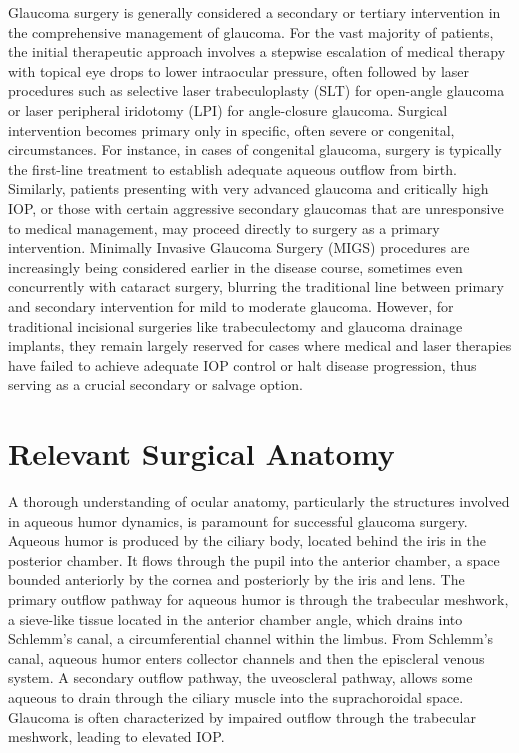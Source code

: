 Glaucoma surgery is generally considered a secondary or tertiary intervention in the comprehensive management of glaucoma. For the vast majority of patients, the initial therapeutic approach involves a stepwise escalation of medical therapy with topical eye drops to lower intraocular pressure, often followed by laser procedures such as selective laser trabeculoplasty (SLT) for open-angle glaucoma or laser peripheral iridotomy (LPI) for angle-closure glaucoma. Surgical intervention becomes primary only in specific, often severe or congenital, circumstances. For instance, in cases of congenital glaucoma, surgery is typically the first-line treatment to establish adequate aqueous outflow from birth. Similarly, patients presenting with very advanced glaucoma and critically high IOP, or those with certain aggressive secondary glaucomas that are unresponsive to medical management, may proceed directly to surgery as a primary intervention. Minimally Invasive Glaucoma Surgery (MIGS) procedures are increasingly being considered earlier in the disease course, sometimes even concurrently with cataract surgery, blurring the traditional line between primary and secondary intervention for mild to moderate glaucoma. However, for traditional incisional surgeries like trabeculectomy and glaucoma drainage implants, they remain largely reserved for cases where medical and laser therapies have failed to achieve adequate IOP control or halt disease progression, thus serving as a crucial secondary or salvage option.

\section*{Relevant Surgical Anatomy}
A thorough understanding of ocular anatomy, particularly the structures involved in aqueous humor dynamics, is paramount for successful glaucoma surgery. Aqueous humor is produced by the ciliary body, located behind the iris in the posterior chamber. It flows through the pupil into the anterior chamber, a space bounded anteriorly by the cornea and posteriorly by the iris and lens. The primary outflow pathway for aqueous humor is through the trabecular meshwork, a sieve-like tissue located in the anterior chamber angle, which drains into Schlemm's canal, a circumferential channel within the limbus. From Schlemm's canal, aqueous humor enters collector channels and then the episcleral venous system. A secondary outflow pathway, the uveoscleral pathway, allows some aqueous to drain through the ciliary muscle into the suprachoroidal space. Glaucoma is often characterized by impaired outflow through the trabecular meshwork, leading to elevated IOP.

